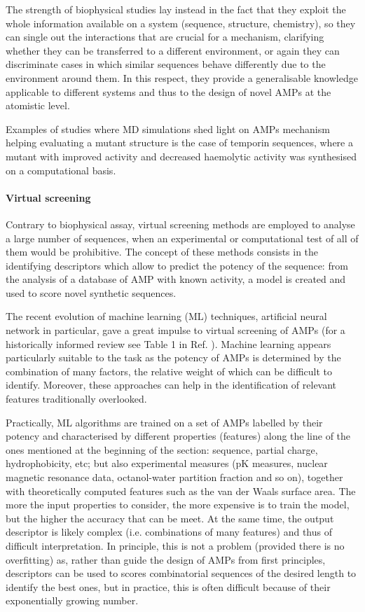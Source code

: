 The strength of biophysical studies lay instead in the fact that they exploit the whole information available on a system (sequence, structure, chemistry), so they can single out the interactions that are crucial for a mechanism, clarifying whether they can be transferred to a different environment, or again they can discriminate cases in which similar sequences behave differently due to the environment around them. In this respect, they provide a generalisable knowledge applicable to different systems and thus to the design of novel AMPs at the atomistic level.

Examples of studies where MD simulations shed light on AMPs mechanism helping evaluating a mutant structure is the case of temporin \cite{Farrotti2017} sequences, where a mutant with improved activity and decreased haemolytic activity was synthesised on a computational basis.

\paragraph{Virtual screening}
Contrary to biophysical assay, virtual screening methods are employed to analyse a large number of sequences, when an experimental or computational test of all of them would be prohibitive. The concept of these methods consists in the identifying descriptors which allow to predict the potency of the sequence: from the analysis of a database of AMP with known activity, a model is created and used to score novel synthetic sequences.

The recent evolution of machine learning (ML) techniques, artificial neural network in particular, gave a great impulse to virtual screening of AMPs (for a historically informed review see Table 1 in Ref. \cite{Fjell2011}). Machine learning appears particularly suitable to the task as the potency of AMPs is determined by the combination of many factors, the relative weight of which can be difficult to identify. Moreover, these approaches can help in the identification of relevant features traditionally overlooked.

Practically, ML algorithms are trained on a set of AMPs labelled by their potency and characterised by different properties (features) along the line of the ones mentioned at the beginning of the section: sequence, partial charge, hydrophobicity, etc; but also experimental measures (pK measures, nuclear magnetic resonance data, octanol-water partition fraction and so on), together with theoretically computed features such as the van der Waals surface area.
%
The more the input properties to consider, the more expensive is to train the model, but the higher the accuracy that can be meet. At the same time, the output descriptor is likely complex (i.e. combinations of many features) and thus of difficult interpretation.
%
In principle, this is not a problem (provided there is no overfitting) as, rather than guide the design of AMPs from first principles, descriptors can be used to scores combinatorial sequences of the desired length to identify the best ones, but in practice, this is often difficult because of their exponentially growing number.

